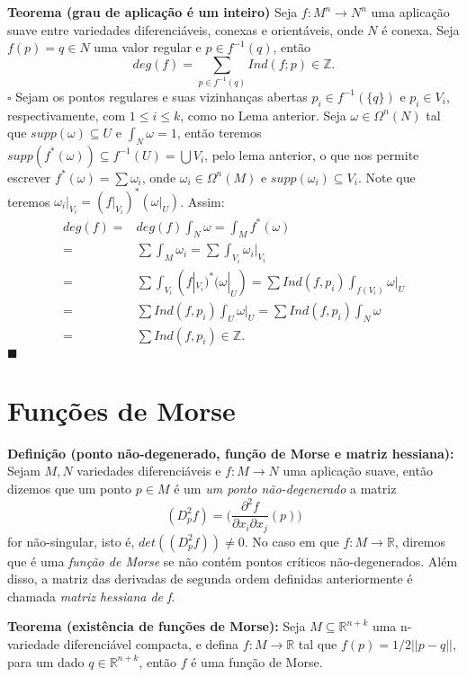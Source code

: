 \documentclass{article}
\begin{document}
	\vspace{2mm}
	\textbf{Teorema (grau de aplicação é um inteiro)} Seja $f : M^{n} \to N^{n}$ uma aplicação suave entre variedades diferenciáveis, conexas e orientáveis, onde $N$ é conexa. Seja $f(p) = q \in N$ uma valor regular e $p \in f^{-1}(q)$, então
	$$
	deg(f) = \sum \limits_{p \in f^{-1}(q)} Ind(f;p) \in \mathbb{Z}.
	$$
	$\square$ Sejam os pontos regulares e suas vizinhanças abertas $p_{i} \in f^{-1}(\{q\})$ e $p_{i} \in V_{i}$, respectivamente, com $1\leq i \leq k$, como no Lema anterior. Seja $\omega \in \Omega^{n}(N)$ tal que $supp(\omega) \subseteq U$ e $\int_{N} \omega = 1$, então teremos $supp(f^{*}(\omega)) \subseteq f^{-1}(U) = \bigcup V_{i}$, pelo lema anterior, o que nos permite escrever $f^{*}(\omega) = \sum \omega_{i}$, onde $\omega_{i} \in \Omega^{n}(M)$ e $supp(\omega_{i}) \subseteq V_{i}$. Note que teremos $\omega_{i}|_{V_{i}}  = (f|_{V_{i}})^{*}(\omega|_{U})$. Assim:
	$$
	\begin{aligned}
	deg(f) =& deg(f)\int_{N} \omega = \int_{M} f^{*}(\omega)
	\\
	=& \sum \int_{M}\omega_{i} = \sum \int_{V_{i}}\omega_{i}|_{V_{i}}
	\\
	=& \sum \int_{V_{i}} (f|_{V_{i}})^{*}(\omega|_{U}) = \sum Ind(f, p_{i}) \int_{f(V_{i})} \omega|_{U}
	\\
	=& \sum Ind(f, p_{i}) \int_{U} \omega|_{U} = \sum Ind(f, p_{i}) \int_{N} \omega
	\\
	=& \sum Ind(f, p_{i}) \in \mathbb{Z}.
	\end{aligned}$$
	$\blacksquare$
	
	\section{Funções de Morse}
	
	\textbf{Definição (ponto não-degenerado, função de Morse e matriz hessiana):} Sejam $M, N$ variedades diferenciáveis e $f: M \to N$ uma aplicação suave, então dizemos que um ponto $p \in M$ é um \textit{um ponto não-degenerado} a matriz $$
	(D_{p}^{2}f) = \Big( \frac{\partial^{2}f}{\partial x_{i} \partial x_{j}} (p) \Big)
	$$
	for não-singular, isto é, $det(	(D_{p}^{2}f)) \neq 0$. No caso em que $f: M \to \mathbb{R}$, diremos que é uma \textit{função de Morse} se não contém pontos críticos não-degenerados. Além disso, a matriz das derivadas de segunda ordem definidas anteriormente é chamada \textit{matriz hessiana de f}.
	
	\vspace{2mm}
	\textbf{Teorema (existência de funções de Morse):} Seja $M \subseteq \mathbb{R}^{n+k}$ uma n-variedade diferenciável compacta, e defina $f:M \to \mathbb{R}$ tal que $f(p) = 1/2||p-q||$, para um dado $q \in \mathbb{R}^{n+k}$, então $f$ é uma função de Morse.
	
\end{document}
